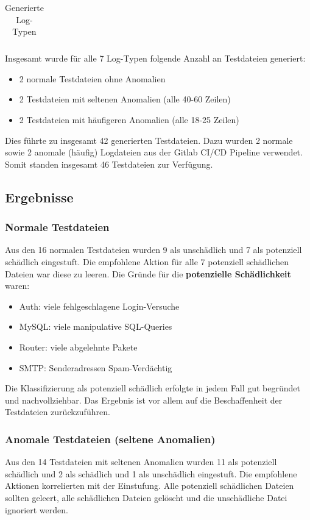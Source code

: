 \documentclass[a4paper,12pt]{report}
\begin{document}
\begin{table}[h!]
\begin{tabular}{|c|p{6cm}|p{6cm}|}
        \end{tabular}
        \caption{Generierte Log-Typen}\label{tab:generated-log-types}
    \end{table}

    \clearpage
    Insgesamt wurde für alle 7 Log-Typen folgende Anzahl an Testdateien generiert:
    \begin{itemize}
        \item 2 normale Testdateien ohne Anomalien
        \item 2 Testdateien mit seltenen Anomalien (alle 40-60 Zeilen)
        \item 2 Testdateien mit häufigeren Anomalien (alle 18-25 Zeilen)
    \end{itemize}
    Dies führte zu insgesamt 42 generierten Testdateien.
    Dazu wurden 2 normale sowie 2 anomale (häufig) Logdateien aus der Gitlab CI/CD Pipeline verwendet.
    Somit standen insgesamt 46 Testdateien zur Verfügung.

    \subsection{Ergebnisse}\label{subsec:ergebnisse}

    \subsubsection{Normale Testdateien}
    Aus den 16 normalen Testdateien wurden 9 als unschädlich und 7 als potenziell schädlich eingestuft.
    Die empfohlene Aktion für alle 7 potenziell schädlichen Dateien war diese zu leeren.
    Die Gründe für die \textbf{potenzielle Schädlichkeit} waren:
    \begin{itemize}
        \item Auth: viele fehlgeschlagene Login-Versuche
        \item MySQL: viele manipulative SQL-Queries
        \item Router: viele abgelehnte Pakete
        \item SMTP: Senderadressen Spam-Verdächtig
    \end{itemize}
    Die Klassifizierung als potenziell schädlich erfolgte in jedem Fall gut begründet und nachvollziehbar.
    Das Ergebnis ist vor allem auf die Beschaffenheit der Testdateien zurückzuführen.

    \subsubsection{Anomale Testdateien (seltene Anomalien)}
    Aus den 14 Testdateien mit seltenen Anomalien wurden 11 als potenziell schädlich und 2 als schädlich und 1 als unschädlich eingestuft.
    Die empfohlene Aktionen korrelierten mit der Einstufung.
    Alle potenziell schädlichen Dateien sollten geleert, alle schädlichen Dateien gelöscht und die unschädliche Datei ignoriert werden.
\end{document}
